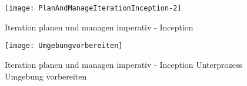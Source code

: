\begin{figure}[!htbp]
\begin{center}
  \texttt{[image: PlanAndManageIterationInception-2]} %
  \caption{Iteration planen und managen imperativ - Inception}
  \label{fig:PlanAndManageIterationInception-2}
\end{center}
\end{figure}

\begin{figure}[!htbp]
\begin{center}
  \texttt{[image: Umgebungvorbereiten]} %
  \caption{Iteration planen und managen imperativ - Inception Unterprozess Umgebung vorbereiten} 
  \label{fig:Umgebungvorbereiten}
\end{center}
\end{figure}

\clearpage


